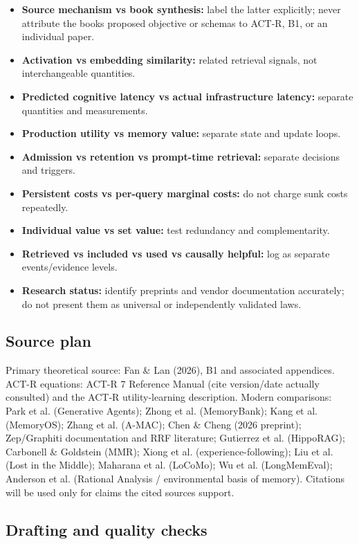 \begin{itemize}
\tightlist
\item
  \textbf{Source mechanism vs book synthesis:} label the latter explicitly; never attribute the book\textquotesingle s proposed objective or schemas to ACT-R, B1, or an individual paper.
\item
  \textbf{Activation vs embedding similarity:} related retrieval signals, not interchangeable quantities.
\item
  \textbf{Predicted cognitive latency vs actual infrastructure latency:} separate quantities and measurements.
\item
  \textbf{Production utility vs memory value:} separate state and update loops.
\item
  \textbf{Admission vs retention vs prompt-time retrieval:} separate decisions and triggers.
\item
  \textbf{Persistent costs vs per-query marginal costs:} do not charge sunk costs repeatedly.
\item
  \textbf{Individual value vs set value:} test redundancy and complementarity.
\item
  \textbf{Retrieved vs included vs used vs causally helpful:} log as separate events/evidence levels.
\item
  \textbf{Research status:} identify preprints and vendor documentation accurately; do not present them as universal or independently validated laws.
\end{itemize}

\subsection{Source plan}\label{source-plan}

Primary theoretical source: Fan \& Lan (2026), B1 and associated appendices. ACT-R equations: ACT-R 7 Reference Manual (cite version/date actually consulted) and the ACT-R utility-learning description. Modern comparisons: Park et al. (Generative Agents); Zhong et al. (MemoryBank); Kang et al. (MemoryOS); Zhang et al. (A-MAC); Chen \& Cheng (2026 preprint); Zep/Graphiti documentation and RRF literature; Gutierrez et al. (HippoRAG); Carbonell \& Goldstein (MMR); Xiong et al. (experience-following); Liu et al. (Lost in the Middle); Maharana et al. (LoCoMo); Wu et al. (LongMemEval); Anderson et al. (Rational Analysis / environmental basis of memory). Citations will be used only for claims the cited sources support.

\subsection{Drafting and quality checks}\label{drafting-and-quality-checks}

